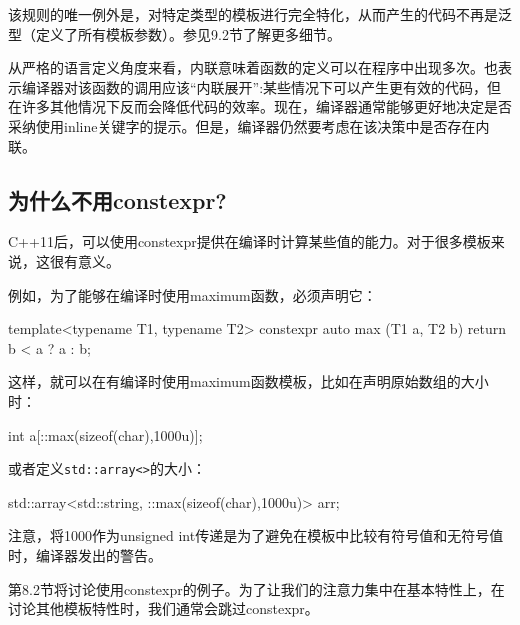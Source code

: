 该规则的唯一例外是，对特定类型的模板进行完全特化，从而产生的代码不再是泛型（定义了所有模板参数）。参见9.2节了解更多细节。
 
从严格的语言定义角度来看，内联意味着函数的定义可以在程序中出现多次。也表示编译器对该函数的调用应该“内联展开”:某些情况下可以产生更有效的代码，但在许多其他情况下反而会降低代码的效率。现在，编译器通常能够更好地决定是否采纳使用inline关键字的提示。但是，编译器仍然要考虑在该决策中是否存在内联。

\subsection{为什么不用constexpr?}

C++11后，可以使用constexpr提供在编译时计算某些值的能力。对于很多模板来说，这很有意义。

例如，为了能够在编译时使用maximum函数，必须声明它：

\begin{cpp}
template<typename T1, typename T2>
constexpr auto max (T1 a, T2 b) {
	return b < a ? a : b;
}
\end{cpp}

这样，就可以在有编译时使用maximum函数模板，比如在声明原始数组的大小时：

\begin{cpp}
int a[::max(sizeof(char),1000u)];
\end{cpp}

或者定义\texttt{std::array<>}的大小：

\begin{cpp}
std::array<std::string, ::max(sizeof(char),1000u)> arr;
\end{cpp}

注意，将1000作为unsigned int传递是为了避免在模板中比较有符号值和无符号值时，编译器发出的警告。

第8.2节将讨论使用constexpr的例子。为了让我们的注意力集中在基本特性上，在讨论其他模板特性时，我们通常会跳过constexpr。











